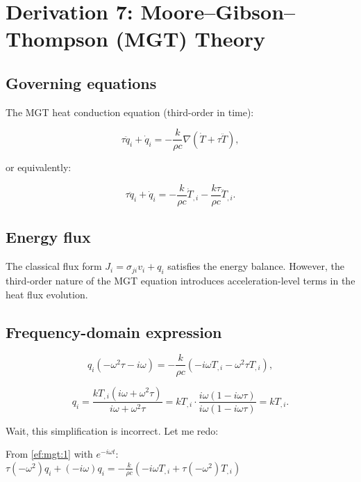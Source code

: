 \section{Derivation 7: Moore--Gibson--Thompson (MGT) Theory}

\subsection{Governing equations}

The MGT heat conduction equation (third-order in time):

\begin{equation}
\tau\ddot{q}_i + \dot{q}_i = -\frac{k}{\rho c}\nabla(\dot{T} + \tau\ddot{T}),
\label{ef:mgt:1}
\end{equation}

or equivalently:

\begin{equation}
\tau\ddot{q}_i + \dot{q}_i = -\frac{k}{\rho c}\dot{T}_{,i} - \frac{k\tau}{\rho c}\ddot{T}_{,i}.
\label{ef:mgt:2}
\end{equation}

\subsection{Energy flux}

The classical flux form $J_i = \sigma_{ji}v_i + q_i$ satisfies the energy balance. However, the third-order nature of the MGT equation introduces acceleration-level terms in the heat flux evolution.

\subsection{Frequency-domain expression}

\begin{equation}
q_i(-\omega^2\tau - i\omega) = -\frac{k}{\rho c}(-i\omega T_{,i} - \omega^2\tau T_{,i}),
\label{ef:mgt:3}
\end{equation}

\begin{equation}
q_i = \frac{k T_{,i}(i\omega + \omega^2\tau)}{i\omega + \omega^2\tau} = k T_{,i} \cdot \frac{i\omega(1 - i\omega\tau)}{i\omega(1 - i\omega\tau)} = k T_{,i}.
\label{ef:mgt:4}
\end{equation}

Wait, this simplification is incorrect. Let me redo:

From \eqref{ef:mgt:1} with $e^{-i\omega t}$:
$\tau(-\omega^2)q_i + (-i\omega)q_i = -\frac{k}{\rho c}(-i\omega T_{,i} + \tau(-\omega^2)T_{,i})$

